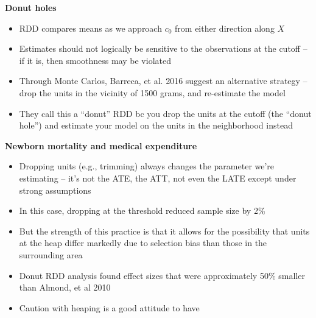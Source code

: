 \documentclass[notes=show]{beamer}
\begin{document}
\begin{frame}[plain]
\begin{center}
\textbf{Donut holes}
\end{center}

\begin{itemize}
\item RDD compares means as we approach $c_0$ from either direction along $X$
\item Estimates should not logically be sensitive to the observations at the cutoff -- if it is, then smoothness may be violated
\item Through Monte Carlos, Barreca, et al. 2016 suggest an alternative strategy -- drop the units in the vicinity of 1500 grams, and re-estimate the model
\item They call this a ``donut'' RDD bc you drop the units at the cutoff (the ``donut hole'') and estimate your model on the units in the neighborhood instead
\end{itemize}

\end{frame}

\begin{frame}[plain]
\begin{center}
\textbf{Newborn mortality and medical expenditure}
\end{center}

\begin{itemize}
\item Dropping units (e.g., trimming) always changes the parameter we're estimating -- it's not the ATE, the ATT, not even the LATE except under strong assumptions
\item In this case, dropping at the threshold reduced sample size by 2\%
\item But the strength of this practice is that it allows for the possibility that units at the heap differ markedly due to selection bias than those in the surrounding area
\item Donut RDD analysis found effect sizes that were approximately 50\% smaller than Almond, et al 2010
\item Caution with heaping is a good attitude to have
\end{itemize}

\end{frame}
\end{document}
